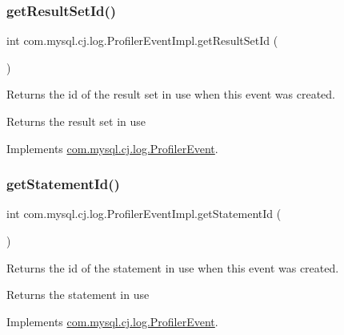 \subsubsection{\texorpdfstring{get\+Result\+Set\+Id()}{getResultSetId()}}
{\footnotesize\ttfamily int com.\+mysql.\+cj.\+log.\+Profiler\+Event\+Impl.\+get\+Result\+Set\+Id (\begin{DoxyParamCaption}{ }\end{DoxyParamCaption})}

Returns the id of the result set in use when this event was created.

\begin{DoxyReturn}{Returns}
the result set in use 
\end{DoxyReturn}


Implements \mbox{\hyperlink{interfacecom_1_1mysql_1_1cj_1_1log_1_1_profiler_event_abe44cf020bbacb1e6c854de7cc8625c9}{com.\+mysql.\+cj.\+log.\+Profiler\+Event}}.

\mbox{\label{classcom_1_1mysql_1_1cj_1_1log_1_1_profiler_event_impl_a3a30e724b4b86369376e1a7402f16d66}} 
\subsubsection{\texorpdfstring{get\+Statement\+Id()}{getStatementId()}}
{\footnotesize\ttfamily int com.\+mysql.\+cj.\+log.\+Profiler\+Event\+Impl.\+get\+Statement\+Id (\begin{DoxyParamCaption}{ }\end{DoxyParamCaption})}

Returns the id of the statement in use when this event was created.

\begin{DoxyReturn}{Returns}
the statement in use 
\end{DoxyReturn}


Implements \mbox{\hyperlink{interfacecom_1_1mysql_1_1cj_1_1log_1_1_profiler_event_abe6c8708b242e58efb697d63c0b78a6d}{com.\+mysql.\+cj.\+log.\+Profiler\+Event}}.

\mbox{\label{classcom_1_1mysql_1_1cj_1_1log_1_1_profiler_event_impl_a5586e172eb7af1a0374145d8afba72ba}} 
